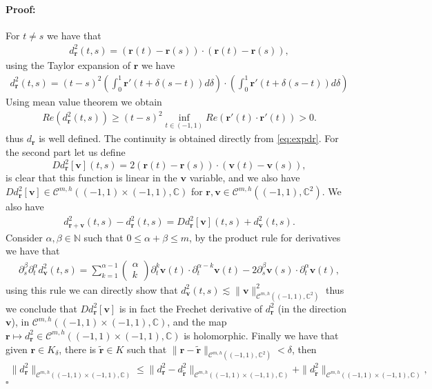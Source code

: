 \documentclass{article}
\newenvironment{proof}{\paragraph{Proof:}}{\hfill$\square$}
\newcommand{\IC}{{\mathbb C}}
\newcommand{\IN}{{\mathbb N}}
\newcommand{\cmspaceh}[4]{\mathcal{C}^{#1,#2} \left( #3, #4 \right)}
\newcommand{\cgeoh}[1]{\mathcal{C}^{#1,h}\left( (-1,1), \IC^2 \right)}
\newcommand{\bv}{\bm{v}}
\newcommand{\br}{\bm{r}}
\newcommand{\iinterv}{(-1,1)\times(-1,1)}
\begin{document}
\begin{proof}
For $t \neq s$ we have that
\begin{align*}
d_{\br}^2(t,s) = (\br(t)-\br(s))\cdot (\br(t) -\br(s)),
\end{align*}
using the Taylor expansion of $\br$ we have 
\begin{align}
\label{eq:expdr}
d_{\br}^2(t,s) = (t-s)^2 \left(\int_{0}^1 \br'(t+\delta(s-t))d\delta \right) \cdot \left(\int_{0}^1 \br'(t+\delta(s-t))d\delta \right)
\end{align}
Using mean value theorem we obtain 
\begin{align}
\label{eq:ddbound}
Re ( d_{\br}^2(t,s)  )  \geq (t-s)^2 \inf_{t \in (-1,1)} Re(\br'(t) \cdot \br'(t)) >0.
\end{align}
thus $d_{\br}$ is well defined. The continuity is obtained directly from \eqref{eq:expdr}. For the second part let us define 
$$
D d_{\br}^2[\bv](t,s) = 2 (\br(t)-\br(s))\cdot (\bv(t) - \bv(s)),
$$
is clear that this function is linear in the $\bv$ variable, and we also have $D d_{\br}^2[\bv] \in \cmspaceh{m}{h}{\iinterv}{\IC}$ for $\br,\bv \in \cmspaceh{m}{h}{(-1,1)}{\IC^2}$. We also have 
\begin{align*}
d^2_{\br+\bv}(t,s) -d^2_{\br}(t,s) =  D d_{\br}^2[\bv](t,s) + d^2_{\bv}(t,s).
\end{align*}
Consider $\alpha, \beta \in \IN$ such that $0 \leq \alpha +\beta \leq m$, by the product rule for derivatives we have that 
\begin{align*}
\partial_s^\beta \partial_t^\alpha d^2_{\bv}(t,s) = \sum_{k=1}^{\alpha-1} \begin{pmatrix} \alpha \\ k \end{pmatrix} \partial_t^k \bv(t) \cdot \partial^{\alpha-k}_t \bv(t) - 2\partial_s^\beta \bv(s) \cdot \partial^\alpha_t \bv(t),
\end{align*} 
using this rule we can directly show that $d_{\bv}^2(t,s) \lesssim \|\bv\|^2_{\cgeoh{m}}$ thus we conclude that $D d_{\br}^2[\bv]$ is in fact the Frechet derivative of $d^2_{\br}$ (in the direction $\bv$), in $\cmspaceh{m}{h}{\iinterv}{\IC}$, and the map $\br  \mapsto d_{\br}^2 \in \cmspaceh{m}{h}{(-1,1)\times(-1,1)}{\IC}$ is holomorphic. Finally we have that given $\br \in K_\delta$, there is $\widetilde{\br} \in K$ such that $\| \br - \widetilde{\br}\|_{\cmspaceh{m}{h}{(-1,1)}{\IC^2}} < \delta$, then 
\begin{align*}
\| d^2_{\br} \|_{\cmspaceh{m}{h}{\iinterv}{\IC}} \leq \| d^2_{\br}  - d_{\widetilde{\br}}^2 \|_{\cmspaceh{m}{h}{\iinterv}{\IC}}  + \| d_{\widetilde{\br}}^2 \|_{\cmspaceh{m}{h}{\iinterv}{\IC}},

\end{align*}
\end{proof}
\end{document}

